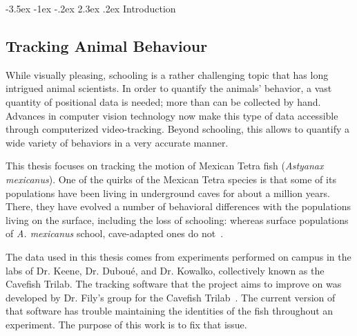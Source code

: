 \documentclass{article}
\makeatletter
\renewcommand\section{\clearpage\newpage\@startsection {section}{1}{\z@}%
	{-3.5ex \@plus -1ex \@minus -.2ex}%
	{2.3ex \@plus.2ex}%
	{\normalfont\Large\bfseries}}
\makeatother
\begin{document}

\tableofcontents


\listoffigures

\newpage


\setlength{\parindent}{1em}



\section{Introduction}

\subsection{Tracking Animal Behaviour}
While visually pleasing, schooling is a rather challenging topic that has long intrigued animal scientists. In order to quantify the animals' behavior, a vast quantity of positional data is needed; more than can be collected by hand. Advances in computer vision technology now make this type of data accessible through computerized video-tracking. Beyond schooling, this allows to quantify a wide variety of behaviors in a very accurate manner.

This thesis focuses on tracking the motion of Mexican Tetra fish (\textit{Astyanax mexicanus}). One of the quirks of the Mexican Tetra species is that some of its populations have been living in underground caves for about a million years. There, they have evolved a number of behavioral differences with the populations living on the surface, including the loss of schooling: whereas surface populations of \emph{A. mexicanus} school, cave-adapted ones do not~\cite{kowalko_utilizing_2020}. 

The data used in this thesis comes from experiments performed on campus in the labs of Dr. Keene, Dr. Dubou\'e, and Dr. Kowalko, collectively known as the Cavefish Trilab. The tracking software that the project aims to improve on was developed by Dr. Fily's group for the Cavefish Trilab~\cite{patch_kinematic_2020, patch_patchmemorycvtracer_2020}. The current version of that software has trouble maintaining the identities of the fish throughout an experiment. The purpose of this work is to fix that issue.
\end{document}

